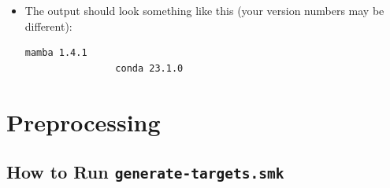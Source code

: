 \documentclass{article}
\begin{document}
\begin{enumerate}
\begin{itemize}
            \item The output should look something like this (your version numbers may be different):
            \begin{lstlisting}[style=bashstyle]
                mamba 1.4.1
                conda 23.1.0
            \end{lstlisting}
        \end{itemize}
    \end{enumerate}
    \pagebreak
    \section{Preprocessing}
    \subsection{How to Run \texttt{generate-targets.smk}}
\end{document}
